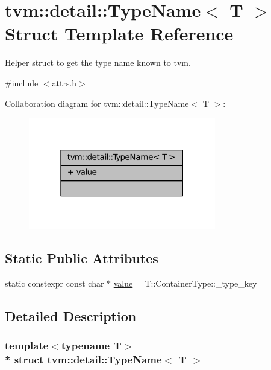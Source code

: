 \hypertarget{structtvm_1_1detail_1_1TypeName}{}\section{tvm\+:\+:detail\+:\+:Type\+Name$<$ T $>$ Struct Template Reference}
\label{structtvm_1_1detail_1_1TypeName}


Helper struct to get the type name known to tvm.  




{\ttfamily \#include $<$attrs.\+h$>$}



Collaboration diagram for tvm\+:\+:detail\+:\+:Type\+Name$<$ T $>$\+:
\nopagebreak
\begin{figure}[H]
\begin{center}
\leavevmode
\includegraphics[width=232pt]{structtvm_1_1detail_1_1TypeName__coll__graph}
\end{center}
\end{figure}
\subsection*{Static Public Attributes}
\begin{DoxyCompactItemize}
\item 
static constexpr const char $\ast$ \hyperlink{structtvm_1_1detail_1_1TypeName_a58c1b5351ce2e7c0c7787448c18287a0}{value} = T\+::\+Container\+Type\+::\+\_\+type\+\_\+key
\end{DoxyCompactItemize}


\subsection{Detailed Description}
\subsubsection*{template$<$typename T$>$\\*
struct tvm\+::detail\+::\+Type\+Name$<$ T $>$}


